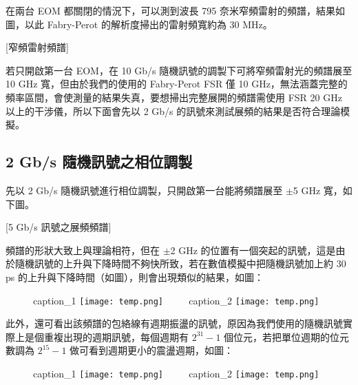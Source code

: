 \documentclass[class=NCU_thesis, crop=false]{standalone}
\begin{document}
在兩台 EOM 都關閉的情況下，可以測到波長 795 奈米窄頻雷射的頻譜，結果如圖，以此 Fabry-Perot 的解析度掃出的雷射頻寬約為 30 MHz。

[窄頻雷射頻譜]

若只開啟第一台 EOM，在 10 Gb/s 隨機訊號的調製下可將窄頻雷射光的頻譜展至 10 GHz 寬，但由於我們的使用的 Fabry-Perot FSR 僅 10 GHz，無法涵蓋完整的頻率區間，會使測量的結果失真，要想掃出完整展開的頻譜需使用 FSR 20 GHz 以上的干涉儀，所以下面會先以 2 Gb/s 的訊號來測試展頻的結果是否符合理論模擬。

\subsection{2 Gb/s 隨機訊號之相位調製}
先以 2 Gb/s 隨機訊號進行相位調製，只開啟第一台能將頻譜展至 $\pm$5 GHz 寬，如下圖。

[5 Gb/s 訊號之展頻頻譜]

頻譜的形狀大致上與理論相符，但在 $\pm$2 GHz 的位置有一個突起的訊號，這是由於隨機訊號的上升與下降時間不夠快所致，若在數值模擬中把隨機訊號加上約 30 ps 的上升與下降時間（如圖），則會出現類似的結果，如圖：

\begin{figure}[!hbt]
    \centering
    \subcaptionbox
        {caption\_1
        \label{fig:subfig_fig1}}
        {\texttt{[image: temp.png]}}
    ~~~~
    \subcaptionbox
        {caption\_2
        \label{fig:subfig_fig2}}
        {\texttt{[image: temp.png]}}
\end{figure}


此外，還可看出該頻譜的包絡線有週期振盪的訊號，原因為我們使用的隨機訊號實際上是個重複出現的週期訊號，每個週期有 $2^{31}-1$ 個位元，若把單位週期的位元數調為 $2^{15}-1$ 做可看到週期更小的震盪週期，如圖：

\begin{figure}[!hbt]
    \centering
    \subcaptionbox
        {caption\_1
        \label{fig:subfig_fig1}}
        {\texttt{[image: temp.png]}}
    ~~~~
    \subcaptionbox
        {caption\_2
        \label{fig:subfig_fig2}}
        {\texttt{[image: temp.png]}}
\end{figure}
\end{document}
